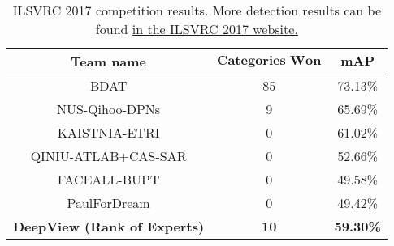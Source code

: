 \documentclass[10pt,twocolumn,letterpaper]{article}
\begin{document}
\begin{table}[tbp]
\vspace{-5pt}
\caption{{ILSVRC 2017 competition results. More detection results can be found \href{http://image-net.org/challenges/LSVRC/2017/results}{ in the ILSVRC 2017 website.}}}  
\vspace{-5pt}
{\footnotesize
\begin{center}
\renewcommand{\tabcolsep}{0.7mm}
\begin{tabular}{c|c|c}
\hline \hline
\textbf{Team name} & $\textbf{Categories Won}$ & $\textbf{mAP}$ \\
\hline 
BDAT & 85 & 73.13\% \\ 
NUS-Qihoo-DPNs  & 9 & 65.69\% \\ 
KAISTNIA-ETRI  & 0 & 61.02\% \\ 
QINIU-ATLAB+CAS-SAR  & 0 & 52.66\% \\ 
FACEALL-BUPT  & 0 & 49.58\% \\ 
PaulForDream  & 0 & 49.42\% \\ 
\cellcolor[gray]{0.875}\color{black}\textbf{DeepView (Rank of Experts)} & \cellcolor[gray]{0.875}\color{black}\textbf{10} & \cellcolor[gray]{0.875}\color{black}\textbf{59.30\%} \\ 

\hline \hline 

\end{tabular}
\end{center}}
\label{TABLE:ILSVRC_Competition}
\vspace{-10pt}
\end{table}
\end{document}

